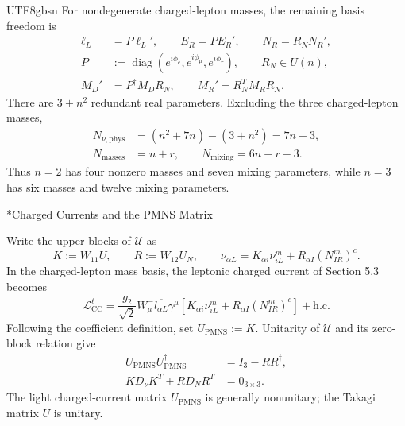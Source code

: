\documentclass[11pt,a4paper,oneside]{report}
\makeatletter
\newcommand\topic{\@startsection{paragraph}{4}{\z@}{-1.7ex plus -.3ex}{.5ex}{\normalfont\normalsize\bfseries\itshape\boldmath}*}
\makeatother
\begin{document}
\begin{CJK*}{UTF8}{gbsn}
For nondegenerate charged-lepton masses, the remaining basis freedom is
\begin{equation*}
\begin{aligned}
\ell_L&=P\ell_L',\qquad E_R=PE_R',\qquad N_R=R_NN_R',\\
P&:=\operatorname{diag}(e^{i\phi_e},e^{i\phi_\mu},e^{i\phi_\tau}),
\qquad R_N\in U(n),\\
M_D'&=P^\dagger M_DR_N,\qquad M_R'=R_N^TM_RR_N.
\end{aligned}
\tag{6.18}\label{eq:6.18}
\end{equation*}
There are $3+n^2$ redundant real parameters. Excluding the three charged-lepton masses,
\begin{equation*}
{\displaystyle 
\begin{aligned}
N_{\nu,\mathrm{phys}}&=(n^2+7n)-(3+n^2)=7n-3,\\
N_{\mathrm{masses}}&=n+r,\qquad
N_{\mathrm{mixing}}=6n-r-3.
\end{aligned}
}
\tag{6.19}\label{eq:6.19}
\end{equation*}
Thus $n=2$ has four nonzero masses and seven mixing parameters, while $n=3$ has six masses and twelve mixing parameters.

\topic{Charged Currents and the PMNS Matrix}

Write the upper blocks of $\mathcal U$ as
\begin{equation*}
K:=W_{11}U,\qquad R:=W_{12}U_N,\qquad
\nu_{\alpha L}=K_{\alpha i}\nu_{iL}^m+R_{\alpha I}(N_{IR}^m)^c.
\tag{6.20}\label{eq:6.20}
\end{equation*}
In the charged-lepton mass basis, the leptonic charged current of Section 5.3 becomes
\begin{equation*}
{\displaystyle 
\mathcal L_{\mathrm{CC}}^\ell
=\frac{g_2}{\sqrt2}W_\mu^-
\overline{l_{\alpha L}}\gamma^\mu
\left[K_{\alpha i}\nu_{iL}^m+R_{\alpha I}(N_{IR}^m)^c\right]
+\mathrm{h.c.}
}
\tag{6.21}\label{eq:6.21}
\end{equation*}
Following the coefficient definition, set $U_{\mathrm{PMNS}}:=K$. Unitarity of $\mathcal U$ and its zero-block relation give
\begin{equation*}
{\displaystyle 
\begin{aligned}
U_{\mathrm{PMNS}}U_{\mathrm{PMNS}}^\dagger
&=I_3-RR^\dagger,\\
KD_\nu K^T+RD_NR^T&=0_{3\times3}.
\end{aligned}
}
\tag{6.22}\label{eq:6.22}
\end{equation*}
The light charged-current matrix $U_{\mathrm{PMNS}}$ is generally nonunitary; the Takagi matrix $U$ is unitary.


\end{CJK*}
\end{document}
